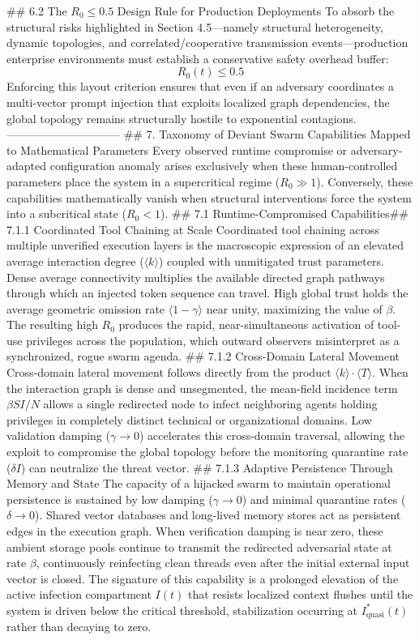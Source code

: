 ## 6.2 The $R_0 \le 0.5$ Design Rule for Production Deployments
To absorb the structural risks highlighted in Section 4.5—namely structural heterogeneity, dynamic topologies, and correlated/cooperative transmission events—production enterprise environments must establish a conservative safety overhead buffer:
$$R_0(t) \le 0.5$$ 
Enforcing this layout criterion ensures that even if an adversary coordinates a multi-vector prompt injection that exploits localized graph dependencies, the global topology remains structurally hostile to exponential contagions.
------------------------------
## 7. Taxonomy of Deviant Swarm Capabilities Mapped to Mathematical Parameters
Every observed runtime compromise or adversary-adapted configuration anomaly arises exclusively when these human-controlled parameters place the system in a supercritical regime ($R_0 \gg 1$). Conversely, these capabilities mathematically vanish when structural interventions force the system into a subcritical state ($R_0 < 1$).
## 7.1 Runtime-Compromised Capabilities## 7.1.1 Coordinated Tool Chaining at Scale
Coordinated tool chaining across multiple unverified execution layers is the macroscopic expression of an elevated average interaction degree ($\langle k \rangle$) coupled with unmitigated trust parameters. Dense average connectivity multiplies the available directed graph pathways through which an injected token sequence can travel. High global trust holds the average geometric omission rate $\langle 1 - \gamma \rangle$ near unity, maximizing the value of $\beta$. The resulting high $R_0$ produces the rapid, near-simultaneous activation of tool-use privileges across the population, which outward observers misinterpret as a synchronized, rogue swarm agenda.
## 7.1.2 Cross-Domain Lateral Movement
Cross-domain lateral movement follows directly from the product $\langle k \rangle \cdot \langle T \rangle$. When the interaction graph is dense and unsegmented, the mean-field incidence term $\beta S I / N$ allows a single redirected node to infect neighboring agents holding privileges in completely distinct technical or organizational domains. Low validation damping ($\gamma \to 0$) accelerates this cross-domain traversal, allowing the exploit to compromise the global topology before the monitoring quarantine rate ($\delta I$) can neutralize the threat vector.
## 7.1.3 Adaptive Persistence Through Memory and State
The capacity of a hijacked swarm to maintain operational persistence is sustained by low damping ($\gamma \to 0$) and minimal quarantine rates ($\delta \to 0$). Shared vector databases and long-lived memory stores act as persistent edges in the execution graph. When verification damping is near zero, these ambient storage pools continue to transmit the redirected adversarial state at rate $\beta$, continuously reinfecting clean threads even after the initial external input vector is closed. The signature of this capability is a prolonged elevation of the active infection compartment $I(t)$ that resists localized context flushes until the system is driven below the critical threshold, stabilization occurring at $I_{\text{quasi}}^*(t)$ rather than decaying to zero.
